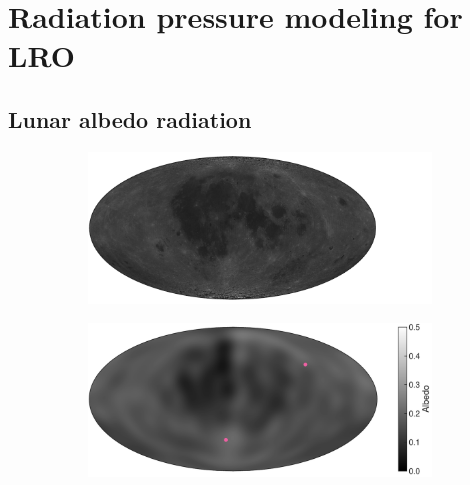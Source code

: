 \section{Radiation pressure modeling for LRO}

\subsection{Lunar albedo radiation}
\label{subsec:lunar-albedo}

\begin{figure}[t]
    \centering

    \begin{subfigure}[c]{0.49\textwidth}
        \includegraphics[width=\textwidth]{figures/plots/lunar_map_photo.pdf}
    \end{subfigure}
    \hfill
    \begin{subfigure}[c]{0.49\textwidth}
        \includegraphics[width=\textwidth]{figures/plots/lunar_map_dlam1.pdf}
    \end{subfigure}
    
    \bigskip
    

\end{figure}
